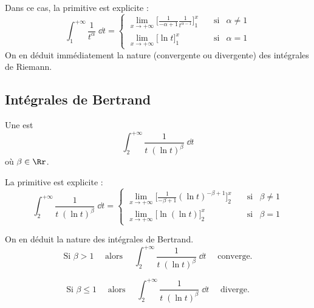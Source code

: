 \documentclass[class=report,crop=false]{standalone}
\begin{document}
Dans ce cas, la primitive est explicite :
$$
\int_1^{+\infty} \frac{1}{t^{\alpha}}\;\dd t = 
\left\{
\begin{array}{lcl}
\displaystyle{\lim_{x\rightarrow+\infty} 
\Big[\tfrac{1}{-\alpha+1}\frac{1}{t^{\alpha-1}}\Big]_1^x}
&\quad\text{si}&\alpha\neq 1\\[2ex]
\displaystyle{\lim_{x\rightarrow+\infty} 
\Big[\ln t\Big]_1^x}
&\quad\text{si}&\alpha= 1
\end{array}
\right.
$$
On en déduit immédiatement la nature (convergente ou divergente)
des intégrales de Riemann.

\medskip



\subsection{Intégrales de Bertrand}

Une  est 
$$\int_2^{+\infty} \frac{1}{t\;(\ln t)^{\beta}}\;\dd t$$
où $\beta \in \Rr$.


La primitive est explicite :
$$
\int_2^{+\infty} \frac{1}{t\;(\ln t)^{\beta}}\;\dd t = 
\left\{
\begin{array}{lcl}
\displaystyle{\lim_{x\rightarrow+\infty} 
\Big[\tfrac{1}{-\beta+1}(\ln t)^{-\beta+1}\Big]_2^x}
&\quad\text{si}&\beta\neq 1\\[2ex]
\displaystyle{\lim_{x\rightarrow+\infty} 
\Big[\ln(\ln t)\Big]_2^x}
&\quad\text{si}&\beta= 1
\end{array}
\right.
$$


On en déduit la nature des intégrales de Bertrand.
$$\text{Si } \beta > 1\quad \text{ alors }\quad
\int_2^{+\infty}\frac{1}{t\;(\ln t)^{\beta}}\;\dd t
\quad\text{ converge.}
$$

$$
\text{Si } \beta\le 1\quad \text{ alors }\quad
\int_2^{+\infty}\frac{1}{t\;(\ln t)^{\beta}}\;\dd t \quad\text{ diverge.}
$$
\end{document}
